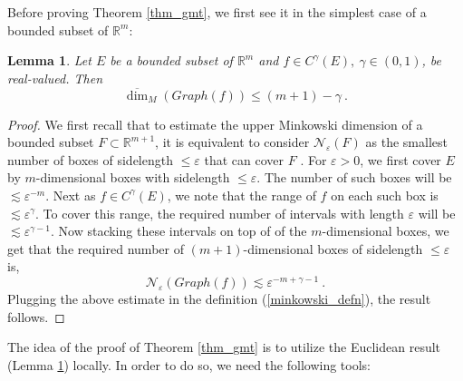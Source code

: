 \documentclass[12pt]{amsart}
\newtheorem{lemma}[theorem]{Lemma}
\theoremstyle{definition}
\newcommand{\R}{\mathbb R}%
\numberwithin{equation}{section}
\begin{document}
Before proving Theorem \ref{thm_gmt}, we first see it in the simplest case of a bounded subset of $\R^m$:
\begin{lemma} \label{gmt_lemma3}
Let $E$ be a bounded subset of $\R^m$ and $f \in C^\gamma(E),\: \gamma \in (0,1)$, be real-valued. Then 
$$\overline{\dim}_M\left(Graph(f)\right) \le (m+1)-\gamma\:.$$
\end{lemma}
\begin{proof}
We first recall that to estimate the upper Minkowski dimension of a bounded subset $F \subset \R^{m+1}$, it is equivalent to consider $\mathcal{N}_\varepsilon(F)$ as the smallest number of boxes of sidelength $\le \varepsilon$ that can cover $F$ \cite[Section 3.1, Chapter 3]{Falconer}. For $\varepsilon>0$, we first cover $E$ by $m$-dimensional boxes with sidelength $\le \varepsilon$. The number of such boxes will be $\lesssim \varepsilon^{-m}$. Next as $f \in C^\gamma(E)$, we note that the range of $f$ on each such box is $\lesssim \varepsilon^\gamma$. To cover this range, the required number of intervals with length $\varepsilon$ will be $\lesssim \varepsilon^{\gamma -1}$. Now stacking these intervals on top of of the $m$-dimensional boxes, we get that the required number of $(m+1)$-dimensional boxes of sidelength $\le \varepsilon$ is,
\begin{equation*}
\mathcal{N}_\varepsilon(Graph(f)) \lesssim \varepsilon^{-m + \gamma -1}\:.
\end{equation*}
Plugging the above estimate in the definition (\ref{minkowski_defn}), the result follows.
\end{proof}

The idea of the proof of Theorem \ref{thm_gmt} is to utilize the Euclidean result (Lemma \ref{gmt_lemma3}) locally. In order to do so, we need the following tools:
\end{document}
